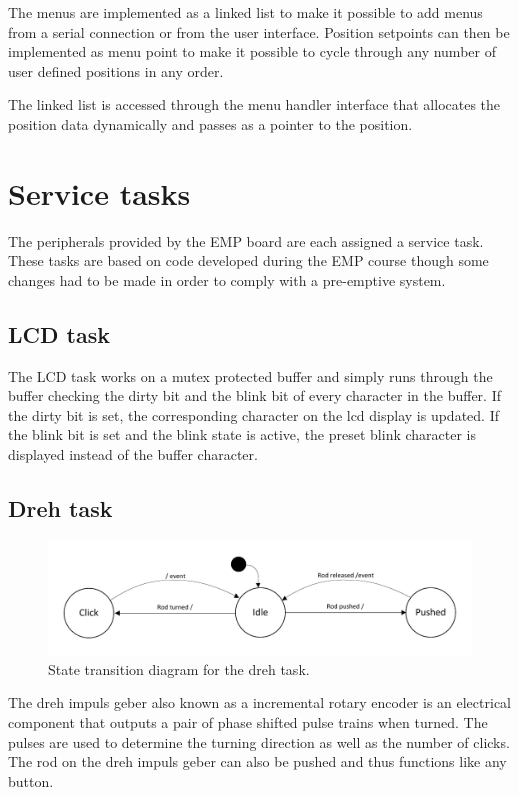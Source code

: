 The menus are implemented as a linked list to make it possible to add menus from a serial connection or from the user interface. Position setpoints can then be implemented as menu point to make it possible to cycle through any number of user defined positions in any order.

The linked list is accessed through the menu handler interface that allocates the position data dynamically and passes as a pointer to the position.

\section{Service tasks}
The peripherals provided by the EMP board are each assigned a service task. These tasks are based on code developed during the EMP course though some changes had to be made in order to comply with a pre-emptive system. 

\subsection{LCD task}
The LCD task works on a mutex protected buffer and simply runs through the buffer checking the dirty bit and the blink bit of every character in the buffer. If the dirty bit is set, the corresponding character on the lcd display is updated. If the blink bit is set and the blink state is active, the preset blink character is displayed instead of the buffer character.

\subsection{Dreh task}
\begin{figure}[htb]
	\centering
	\includegraphics[width=\textwidth,clip,trim=0 15 0 15]{graphics/dreh_task_fsm.pdf} 
	\caption{State transition diagram for the dreh task.}
	\label{fig:task_dreh_fsm}
\end{figure}
The dreh impuls geber also known as a incremental rotary encoder is an electrical component that outputs a pair of phase shifted pulse trains when turned. The pulses are used to determine the turning direction as well as the number of clicks. The rod on the dreh impuls geber can also be pushed and thus functions like any button.

